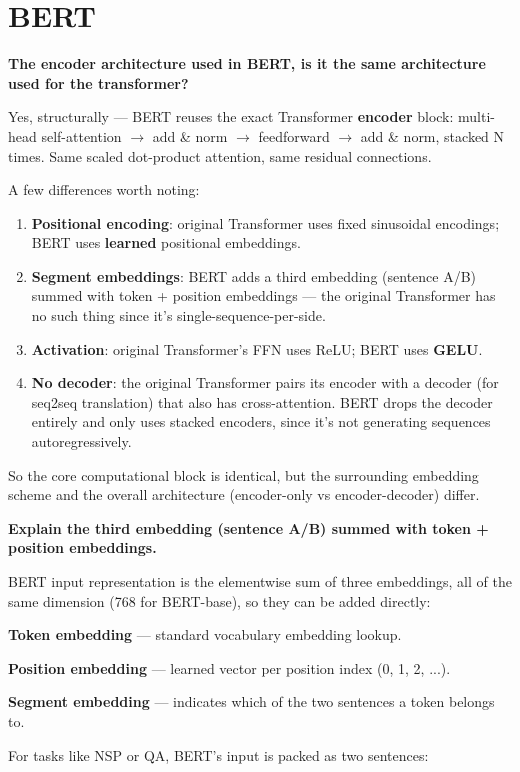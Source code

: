 \section{BERT}

\textbf{The encoder architecture used in BERT, is it the same architecture used for the transformer?}

Yes, structurally --- BERT reuses the exact Transformer \textbf{encoder} block: multi-head self-attention $\to$ add \& norm $\to$ feedforward $\to$ add \& norm, stacked N times. Same scaled dot-product attention, same residual connections.

A few differences worth noting:

\begin{enumerate}
\item \textbf{Positional encoding}: original Transformer uses fixed sinusoidal encodings; BERT uses \textbf{learned} positional embeddings.
\item \textbf{Segment embeddings}: BERT adds a third embedding (sentence A/B) summed with token + position embeddings --- the original Transformer has no such thing since it's single-sequence-per-side.
\item \textbf{Activation}: original Transformer's FFN uses ReLU; BERT uses \textbf{GELU}.
\item \textbf{No decoder}: the original Transformer pairs its encoder with a decoder (for seq2seq translation) that also has cross-attention. BERT drops the decoder entirely and only uses stacked encoders, since it's not generating sequences autoregressively.
\end{enumerate}

So the core computational block is identical, but the surrounding embedding scheme and the overall architecture (encoder-only vs encoder-decoder) differ.

\textbf{Explain the third embedding (sentence A/B) summed with token + position embeddings.}

BERT input representation is the elementwise sum of three embeddings, all of the same dimension (768 for BERT-base), so they can be added directly:

\textbf{Token embedding} --- standard vocabulary embedding lookup.

\textbf{Position embedding} --- learned vector per position index (0, 1, 2, ...).

\textbf{Segment embedding} --- indicates which of the two sentences a token belongs to.

For tasks like NSP or QA, BERT's input is packed as two sentences:


